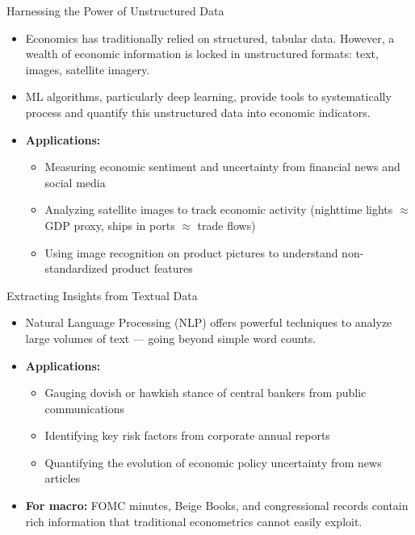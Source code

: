 \documentclass[10pt,english,aspectratio=169]{beamer}
\begin{document}
\begin{frame}{Harnessing the Power of Unstructured Data}
\begin{itemize}
\item Economics has traditionally relied on structured, tabular data. However, a wealth of economic information is locked in unstructured formats: text, images, satellite imagery.
\item ML algorithms, particularly deep learning, provide tools to systematically process and quantify this unstructured data into economic indicators.
\item \textbf{Applications:}
\begin{itemize}
\item Measuring economic sentiment and uncertainty from financial news and social media
\item Analyzing satellite images to track economic activity (nighttime lights $\approx$ GDP proxy, ships in ports $\approx$ trade flows)
\item Using image recognition on product pictures to understand non-standardized product features
\end{itemize}
\end{itemize}
\end{frame}

\begin{frame}{Extracting Insights from Textual Data}
\begin{itemize}
\item Natural Language Processing (NLP) offers powerful techniques to analyze large volumes of text --- going beyond simple word counts.
\item \textbf{Applications:}
\begin{itemize}
\item Gauging dovish or hawkish stance of central bankers from public communications
\item Identifying key risk factors from corporate annual reports
\item Quantifying the evolution of economic policy uncertainty from news articles
\end{itemize}

\medskip
\item \textbf{For macro:} FOMC minutes, Beige Books, and congressional records contain rich information that traditional econometrics cannot easily exploit.
\end{itemize}
\end{frame}
\end{document}

